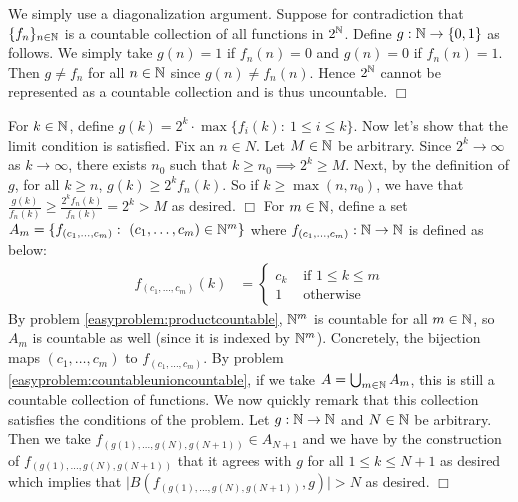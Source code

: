 \documentclass{article}
\begin{document}
 {
    We simply use a diagonalization argument. Suppose for contradiction that $\{f_{n}\}_{n\in \mathbb{N}}$ is a countable collection of all functions in $2^{\mathbb{N}}$. Define $g: \mathbb{N}\to \{0,1\}$ as follows. We simply take $g(n) = 1$ if $f_{n}(n) = 0$ and $g(n) = 0$ if $f_{n}(n) = 1$. Then $g\neq f_{n}$ for all $n\in \mathbb{N}$ since $g(n) \neq f_{n}(n)$. Hence $2^{\mathbb{N}}$ cannot be represented as a countable collection and is thus uncountable. $\Box$
}

 {
    For $k\in \mathbb{N}$, define $g(k) = 2^{k}\cdot\max\{f_{i}(k):\ 1\leq i \leq k\}$. Now let's show that the limit condition is satisfied. Fix an $n\in N$. Let $M\in \mathbb{N}$ be arbitrary. Since $2^{k}\to \infty$ as $k\to\infty$, there exists $n_{0}$ such that $k\geq n_{0}\implies 2^{k}\geq M$. Next, by the definition of $g$, for all $k\geq n$, $g(k) \geq 2^{k}f_{n}(k)$. So if $k\geq \max(n, n_{0})$, we have that $\frac{g(k)}{f_{n}(k)}\geq \frac{2^{k}f_{n}(k)}{f_{n}(k)} = 2^{k} > M$ as desired. $\Box$
}
 {
    For $m\in\mathbb{N}$, define a set $A_{m} = \{f_{(c_{1},\dots, c_{m})}:\ (c_{1},\dots, c_{m})\in\bN^{m}\}$ where $f_{(c_{1},\dots, c_{m})}: \mathbb{N}\to \mathbb{N}$ is defined as below:
    \begin{align*}
        f_{(c_{1},\dots, c_{m})}(k) &= \begin{cases}
            c_{k}&\text{ if }1\leq k \leq m\\
            1 & \text{ otherwise}
        \end{cases}
    \end{align*}
    By problem \ref{easyproblem:productcountable}, $\mathbb{N}^{m}$ is countable for all $m\in \mathbb{N}$, so $A_{m}$ is countable as well (since it is indexed by $\mathbb{N}^{m}$). Concretely, the bijection maps $(c_{1},\dots, c_{m})$ to $f_{(c_{1},\dots, c_{m})}$. By problem \ref{easyproblem:countableunioncountable}, if we take $A = \bigcup_{m\in \mathbb{N}}A_{m}$, this is still a countable collection of functions. We now quickly remark that this collection satisfies the conditions of the problem. Let $g:\mathbb{N}\to \mathbb{N}$ and $N\in \mathbb{N}$ be arbitrary. Then we take $f_{(g(1),\dots, g(N), g(N+1))}\in A_{N+1}$ and we have by the construction of $f_{(g(1),\dots, g(N), g(N+1))}$ that it agrees with $g$ for all $1\leq k \leq N+1$ as desired which implies that $\lvert B(f_{(g(1),\dots, g(N), g(N+1))}, g) \rvert > N$ as desired. $\Box$
}
\end{document}
